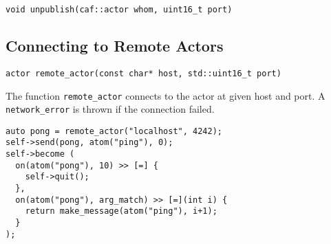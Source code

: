 \begin{lstlisting}
void unpublish(caf::actor whom, uint16_t port)
\end{lstlisting}

\subsection{Connecting to Remote Actors}

\begin{lstlisting}
actor remote_actor(const char* host, std::uint16_t port)
\end{lstlisting}

The function \lstinline^remote_actor^ connects to the actor at given host and port.
A \lstinline^network_error^ is thrown if the connection failed.

\begin{lstlisting}
auto pong = remote_actor("localhost", 4242);
self->send(pong, atom("ping"), 0);
self->become (
  on(atom("pong"), 10) >> [=] {
    self->quit();
  },
  on(atom("pong"), arg_match) >> [=](int i) {
    return make_message(atom("ping"), i+1);
  }
);
\end{lstlisting}
